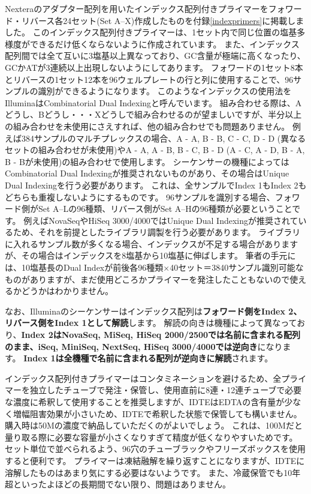\documentclass[titlepage,10pt,a4paper,uplatex]{jsbook}
\renewcommand{\textbf}[1]{{\bfseries\sffamily#1}}
\begin{document}
Nexteraのアダプター配列を用いたインデックス配列付きプライマーをフォワード・リバース各24セット(Set A--X)作成したものを付録\ref{indexprimers}に掲載しました。
このインデックス配列付きプライマーは、1セット内で同じ位置の塩基多様度ができるだけ低くならないように作成されています。
また、インデックス配列間では全て互いに3塩基以上異なっており、GC含量が極端に高くなったり、GCかATが3連続以上出現しないようにしてあります。
フォワードの1セット8本とリバースの1セット12本を96ウェルプレートの行と列に使用することで、96サンプルの識別ができるようになります。
このようなインデックスの使用法をIlluminaはCombinatorial Dual Indexingと呼んでいます。
組み合わせる際は、Aどうし、Bどうし・・・Xどうしで組み合わせるのが望ましいですが、半分以上の組み合わせを未使用にさえすれば、他の組み合わせでも問題ありません。
例えば384サンプルのマルチプレックスの場合、A - A, B - B, C - C, D - D (異なるセットの組み合わせが未使用)やA - A, A - B, B - C, B - D (A - C, A - D, B - A, B - Bが未使用)の組み合わせで使用します。
シーケンサーの機種によってはCombinatorial Dual Indexingが推奨されないものがあり、その場合はUnique Dual Indexingを行う必要があります。
これは、全サンプルでIndex 1もIndex 2もどちらも重複しないようにするものです。
96サンプルを識別する場合、フォワード側がSet A--Lの96種類、リバース側がSet A--Hの96種類が必要ということです。
例えばNovaSeqやHiSeq 3000/4000ではUnique Dual Indexingが推奨されているため、それを前提としたライブラリ調製を行う必要があります。
ライブラリに入れるサンプル数が多くなる場合、インデックスが不足する場合がありますが、その場合はインデックスを8塩基から10塩基に伸ばします。
筆者の手元には、10塩基長のDual Indexが前後各96種類×40セット＝3840サンプル識別可能なものがありますが、まだ使用どころかプライマーを発注したこともないので使えるかどうかはわかりません。

なお、Illuminaのシーケンサーはインデックス配列は\textbf{フォワード側をIndex 2、リバース側をIndex 1として解読}します。
解読の向きは機種によって異なっており、\textbf{Index 2はNovaSeq, MiSeq, HiSeq 2000/2500では名前に含まれる配列のまま、iSeq, MiniSeq, NextSeq, HiSeq 3000/4000では逆向き}になります。
\textbf{Index 1は全機種で名前に含まれる配列が逆向きに解読}されます。

インデックス配列付きプライマーはコンタミネーションを避けるため、全プライマーを独立したチューブで発注・保管し、使用直前に8連・12連チューブで必要な濃度に希釈して使用することを推奨しますが、IDTEはEDTAの含有量が少なく増幅阻害効果が小さいため、IDTEで希釈した状態で保管しても構いません。
購入時は50{\textmu}Mの濃度で納品していただくのがよいでしょう。
これは、100{\textmu}Mだと量り取る際に必要な容量が小さくなりすぎて精度が低くなりやすいためです。
セット単位で並べられるよう、96穴のチューブラックやフリーズボックスを使用すると便利です。
プライマーは凍結融解を繰り返すことになりますが、IDTEに溶解したものはあまり気にする必要はないようです\citep{Speicher2017}。
また、冷蔵保管でも10年超といったよほどの長期間でない限り、問題はありません。
\end{document}
